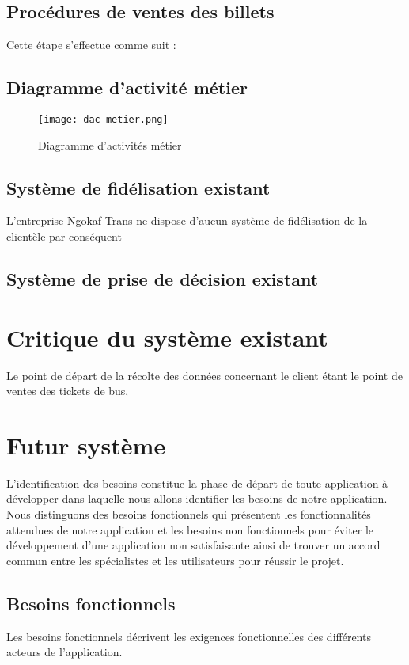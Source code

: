         \subsection[Procédures de ventes des billets]{Procédures de ventes des billets}
        Cette étape s’effectue comme suit :
\pagebreak
        \subsection[Diagramme d’activité métier]{Diagramme d’activité métier}
            \begin{figure}[h!]
                \centering
                \texttt{[image: dac-metier.png]}
                \caption{Diagramme d’activités métier}
                \label{fig:DacMetier}
            \end{figure}
\pagebreak
        \subsection[Système de fidélisation existant]{Système de fidélisation existant}
        L’entreprise Ngokaf Trans ne dispose d’aucun système de fidélisation de la clientèle
        par conséquent 
        \subsection[Système de prise de décision existant]{Système de prise de décision existant}
    \section[Critique du système existant]{Critique du système existant}
    Le point de départ de la récolte des données concernant le client étant le
    point de ventes des tickets de bus, 
    \section[Futur système]{Futur système}
    L’identification des besoins constitue la phase de départ de toute
    application à développer dans laquelle nous allons identifier
    les besoins de notre application. Nous distinguons des besoins
    fonctionnels qui présentent les fonctionnalités attendues de notre
    application et les besoins non fonctionnels pour éviter le développement
    d’une application non satisfaisante ainsi de trouver un
    accord commun entre les spécialistes et les utilisateurs pour réussir le projet.
        \subsection{Besoins fonctionnels}
        Les besoins fonctionnels décrivent les exigences fonctionnelles
        des différents acteurs de l’application.
